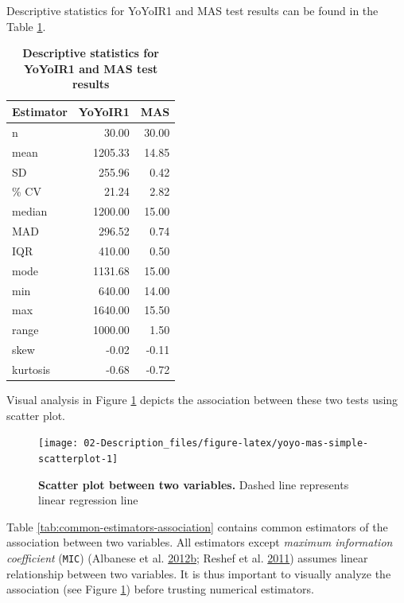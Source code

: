 \documentclass[
]{book}
\begin{document}
Descriptive statistics for YoYoIR1 and MAS test results can be found in the Table \ref{tab:yoyo-mas-descriptive-stats}.



\begin{table}

\caption{\label{tab:yoyo-mas-descriptive-stats}\textbf{Descriptive statistics for YoYoIR1 and MAS test results}}
\centering
\begin{tabular}[t]{lrr}
\toprule
Estimator & YoYoIR1 & MAS\\
\midrule
n & 30.00 & 30.00\\
mean & 1205.33 & 14.85\\
SD & 255.96 & 0.42\\
\% CV & 21.24 & 2.82\\
median & 1200.00 & 15.00\\
\addlinespace
MAD & 296.52 & 0.74\\
IQR & 410.00 & 0.50\\
mode & 1131.68 & 15.00\\
min & 640.00 & 14.00\\
max & 1640.00 & 15.50\\
\addlinespace
range & 1000.00 & 1.50\\
skew & -0.02 & -0.11\\
kurtosis & -0.68 & -0.72\\
\bottomrule
\end{tabular}
\end{table}

Visual analysis in Figure \ref{fig:yoyo-mas-simple-scatterplot} depicts the association between these two tests using scatter plot.

\begin{figure}

{\centering \texttt{[image: 02-Description\_files/figure-latex/yoyo-mas-simple-scatterplot-1]} 

}

\caption{\textbf{Scatter plot between two variables. }Dashed line represents linear regression line}\label{fig:yoyo-mas-simple-scatterplot}
\end{figure}



Table \ref{tab:common-estimators-association} contains common estimators of the association between two variables. All estimators except \emph{maximum information coefficient} (\texttt{MIC}) (Albanese et al. \protect\hyperlink{ref-albaneseMinervaMinepyEngine2012}{2012}\protect\hyperlink{ref-albaneseMinervaMinepyEngine2012}{b}; Reshef et al. \protect\hyperlink{ref-reshefDetectingNovelAssociations2011}{2011}) assumes linear relationship between two variables. It is thus important to visually analyze the association (see Figure \ref{fig:yoyo-mas-simple-scatterplot}) before trusting numerical estimators.
\end{document}
